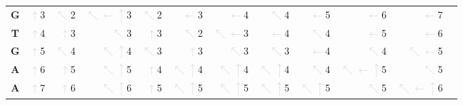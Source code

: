 \begin{table}[ht]
{\begin{tabular}{c|rrrrrrrrrrr}
               \bf{G} & \colorbox{lightgray!25}{\textcolor{lightgray}{\(\uparrow\)}3} & \textcolor{lightgray}{\(\nwarrow\)}2 & \textcolor{lightgray}{\(\nwarrow\leftarrow\uparrow\)}3 & \colorbox{lightgray!50}{\textcolor{lightgray}{\(\nwarrow\)}2} & \textcolor{lightgray}{\(\leftarrow\)}3 & \textcolor{lightgray}{\(\leftarrow\)}4 & \textcolor{lightgray}{\(\nwarrow\)}4 & \textcolor{lightgray}{\(\leftarrow\)}5 & \textcolor{lightgray}{\(\leftarrow\)}6 & \textcolor{lightgray}{\(\leftarrow\)}7 \\
               \bf{T} & \colorbox{lightgray!25}{\textcolor{lightgray}{\(\uparrow\)}4} & \textcolor{lightgray}{\(\uparrow\)}3 & \textcolor{lightgray}{\(\nwarrow\)}3 & \textcolor{lightgray}{\(\uparrow\)}3 & \colorbox{lightgray!50}{\textcolor{lightgray}{\(\nwarrow\)}2} & \textcolor{lightgray}{\(\nwarrow\leftarrow\)}3 & \textcolor{lightgray}{\(\leftarrow\)}4 & \textcolor{lightgray}{\(\nwarrow\)}4 & \textcolor{lightgray}{\(\leftarrow\)}5 & \textcolor{lightgray}{\(\leftarrow\)}6 \\
               \bf{G} & \colorbox{lightgray!25}{\textcolor{lightgray}{\(\uparrow\)}5} & \textcolor{lightgray}{\(\nwarrow\)}4 & \textcolor{lightgray}{\(\nwarrow\uparrow\)}4 & \textcolor{lightgray}{\(\nwarrow\)}3 & \textcolor{lightgray}{\(\uparrow\)}3 & \colorbox{lightgray!50}{\textcolor{lightgray}{\(\nwarrow\)}3} & \textcolor{lightgray}{\(\nwarrow\)}3 & \textcolor{lightgray}{\(\leftarrow\)}4 & \textcolor{lightgray}{\(\nwarrow\)}4 & \textcolor{lightgray}{\(\nwarrow\leftarrow\)}5 \\
               \bf{A} & \colorbox{lightgray!25}{\textcolor{lightgray}{\(\uparrow\)}6} & \textcolor{lightgray}{\(\uparrow\)}5 & \textcolor{lightgray}{\(\nwarrow\uparrow\)}5 & \textcolor{lightgray}{\(\uparrow\)}4 & \textcolor{lightgray}{\(\nwarrow\uparrow\)}4 & \textcolor{lightgray}{\(\nwarrow\uparrow\)}4 & \colorbox{lightgray!50}{\textcolor{lightgray}{\(\nwarrow\uparrow\)}4} & \textcolor{lightgray}{\(\nwarrow\)}4 & \textcolor{lightgray}{\(\nwarrow\leftarrow\uparrow\)}5 & \textcolor{lightgray}{\(\nwarrow\)}5 \\
               \bf{A} & \colorbox{lightgray!25}{\textcolor{lightgray}{\(\uparrow\)}7} & \textcolor{lightgray}{\(\uparrow\)}6 & \textcolor{lightgray}{\(\nwarrow\uparrow\)}6 & \textcolor{lightgray}{\(\uparrow\)}5 & \textcolor{lightgray}{\(\nwarrow\uparrow\)}5 & \textcolor{lightgray}{\(\nwarrow\uparrow\)}5 & \textcolor{lightgray}{\(\nwarrow\uparrow\)}5 & \colorbox{lightgray!50}{\textcolor{lightgray}{\(\nwarrow\uparrow\)}5} & \textcolor{lightgray}{\(\nwarrow\)}5 & \textcolor{lightgray}{\(\nwarrow\leftarrow\uparrow\)}6 \\

\end{tabular}}
\end{table}

